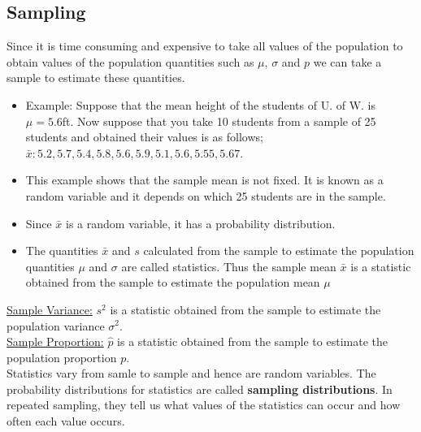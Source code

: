 \documentclass[12pt, letterpaper]{article}
\begin{document}
        \subsection{Sampling}
            Since it is time consuming and expensive to take all values of the population to obtain values of the population quantities such as $\mu$, $\sigma$ and $p$ we can take a sample to estimate these quantities.
            \begin{itemize}
                \item Example: Suppose that the mean height of the students of U. of W. is \\$\mu = 5.6$ft. Now suppose that you take 10 students from a sample of 25 \\students and obtained their values is as follows; \\$\bar{x}: 5.2, 5.7, 5.4, 5.8, 5.6, 5.9, 5.1, 5.6, 5.55, 5.67$.
                \item This example shows that the sample mean is not fixed. It is known as a random variable and it depends on which 25 students are in the sample.
                \item Since $\bar{x}$ is a random variable, it has a probability distribution.
                \item The quantities $\bar{x}$ and $s$ calculated from the sample to estimate the population quantities $\mu$ and $\sigma$ are called statistics. Thus the sample mean $\bar{x}$ is a statistic obtained from the sample to estimate the population mean $\mu$
            \end{itemize}
            \underline{Sample Variance:} $s^2$ is a statistic obtained from the sample to estimate the population variance $\sigma^2$.
            \\ \underline{Sample Proportion:} $\hat{p}$ is a statistic obtained from the sample to estimate the population proportion $p$.
            \\ Statistics vary from samle to sample and hence are random variables. The probability distributions for statistics are called \textbf{sampling distributions}. In repeated sampling, they tell us what values of the statistics can occur and how often each value occurs.
        
\end{document}
